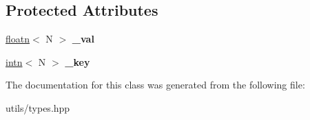 \subsection*{Protected Attributes}
\begin{DoxyCompactItemize}
\item 
\hypertarget{classifloatn_aaeda646e8023f9b0ceb60a4ecdbe5010}{}\hyperlink{classprimitive}{floatn}$<$ N $>$ {\bfseries \+\_\+val}\label{classifloatn_aaeda646e8023f9b0ceb60a4ecdbe5010}

\item 
\hypertarget{classifloatn_aac28a60f55fcdf647c049d2511a67690}{}\hyperlink{classprimitive}{intn}$<$ N $>$ {\bfseries \+\_\+key}\label{classifloatn_aac28a60f55fcdf647c049d2511a67690}

\end{DoxyCompactItemize}


The documentation for this class was generated from the following file\+:\begin{DoxyCompactItemize}
\item 
utils/types.\+hpp\end{DoxyCompactItemize}
